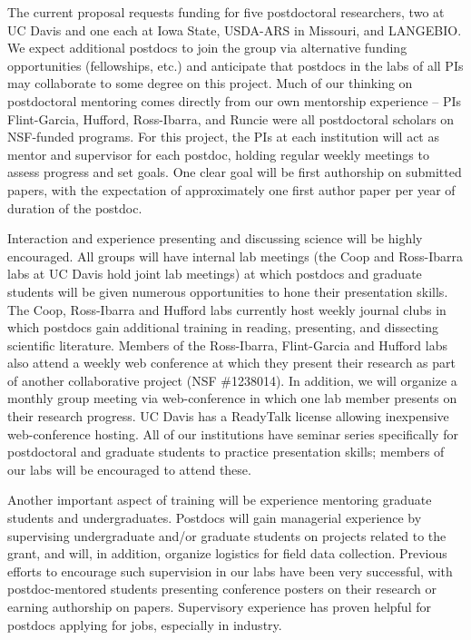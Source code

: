 The current proposal requests funding for five postdoctoral researchers, two at UC Davis and one each at Iowa State, USDA-ARS in Missouri, and LANGEBIO. We expect additional postdocs to join the group via alternative funding opportunities (fellowships, etc.) and anticipate that postdocs in the labs of all PIs may collaborate to some degree on this project.  Much of our thinking on postdoctoral mentoring comes directly from our own mentorship experience -- PIs Flint-Garcia, Hufford, Ross-Ibarra, and Runcie were all postdoctoral scholars on NSF-funded programs. For this project, the PIs at each institution will act as mentor and supervisor for each postdoc, holding regular weekly meetings to assess progress and set goals.  One clear goal will be first authorship on submitted papers, with the expectation of approximately one first author paper per year of duration of the postdoc. 

Interaction and experience presenting and discussing science will be highly encouraged. All groups will have internal lab meetings (the Coop and Ross-Ibarra labs at UC Davis hold joint lab meetings) at which postdocs and graduate students will be given numerous opportunities to hone their presentation skills.  The Coop, Ross-Ibarra and Hufford labs currently host weekly journal clubs in which postdocs gain additional training in reading, presenting, and dissecting scientific literature. Members of the Ross-Ibarra, Flint-Garcia and Hufford labs also attend a weekly web conference at which they present their research as part of another collaborative project (NSF \#1238014). In addition, we will organize a monthly group meeting via web-conference in which one lab member presents on their research progress.  UC Davis has a ReadyTalk license allowing inexpensive web-conference hosting. All of our institutions have seminar series specifically for postdoctoral and graduate students to practice presentation skills; members of our labs will be encouraged to attend these.

Another important aspect of training will be experience mentoring graduate students and undergraduates.  Postdocs will gain managerial experience by supervising undergraduate and/or graduate students on projects related to the grant, and will, in addition, organize logistics for field data collection.  Previous efforts to encourage such supervision in our labs have been very successful, with postdoc-mentored students presenting conference posters on their research or earning authorship on papers.  Supervisory experience has proven helpful for postdocs applying for jobs, especially in industry.

